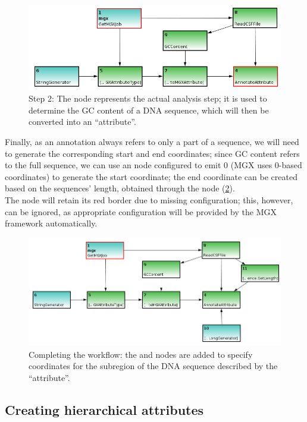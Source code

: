 \begin{figure}[H]
\centering
\includegraphics[width=.8\textwidth]{img/conveyor/annotate_templ3}
\caption[Metagenome annotation]{Step 2: The  node represents the actual analysis step; it is used
to determine the GC content of a DNA sequence, which will then be converted into an ``attribute''.}
\label{annot3}
\end{figure}

Finally, as an annotation always refers to only a part of a sequence, we will need to generate the corresponding
start and end coordinates; since GC content refers to the full sequence, we can use an  node
configured to emit 0 (MGX uses 0-based coordinates) to generate the start coordinate; the end coordinate can be
created based on the sequences' length, obtained through the  node (\ref{annot4}).\\
The  node will retain its red border due to missing configuration; this, however, can be
ignored, as appropriate configuration will be provided by the MGX framework automatically.

\begin{figure}[H]
\centering
\includegraphics[width=.9\textwidth]{img/conveyor/annotate_templ4}
\caption[Metagenome annotation]{Completing the workflow: the  and  nodes
are added to specify coordinates for the subregion of the DNA sequence described by the ``attribute''.}
\label{annot4}
\end{figure}

\subsection{Creating hierarchical attributes}

